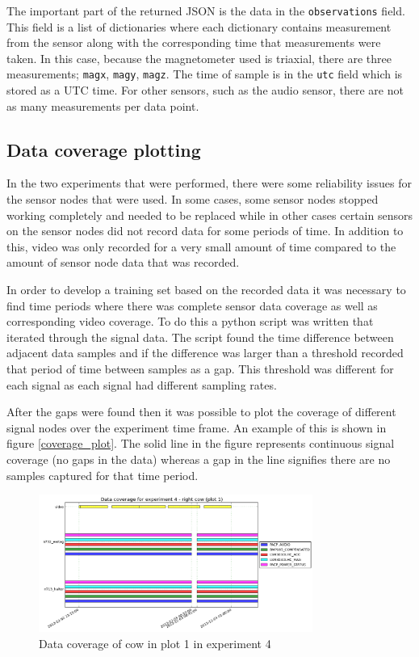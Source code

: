 The important part of the returned JSON is the data in the \texttt{observations} field. This field is a list of dictionaries where each dictionary contains measurement from the sensor along with the corresponding time that measurements were taken. In this case, because the magnetometer used is triaxial, there are three measurements; \texttt{magx}, \texttt{magy}, \texttt{magz}. The time of sample is in the \texttt{utc} field which is stored as a UTC time. For other sensors, such as the audio sensor, there are not as many measurements per data point. 

\subsection{Data coverage plotting}

In the two experiments that were performed, there were some reliability issues for the sensor nodes that were used. In some cases, some sensor nodes stopped working completely and needed to be replaced while in other cases certain sensors on the sensor nodes did not record data for some periods of time. In addition to this, video was only recorded for a very small amount of time compared to the amount of sensor node data that was recorded. 

In order to develop a training set based on the recorded data it was necessary to find time periods where there was complete sensor data coverage as well as corresponding video coverage. To do this a python script was written that iterated through the signal data. The script found the time difference between adjacent data samples and if the difference was larger than a threshold recorded that period of time between samples as a gap. This threshold was different for each signal as each signal had different sampling rates. 

After the gaps were found then it was possible to plot the coverage of different signal nodes over the experiment time frame. An example of this is shown in figure \ref{coverage_plot}. The solid line in the figure represents continuous signal coverage (no gaps in the data) whereas a gap in the line signifies there are no samples captured for that time period. 

\begin{figure}[ht!]
\begin{center}
\leavevmode
\includegraphics[width=0.8\textwidth]{images/experiment4_coverage_zoomed.png}
\end{center}
\caption{Data coverage of cow in plot 1 in experiment 4}
\label{exp4overall}
\end{figure}

